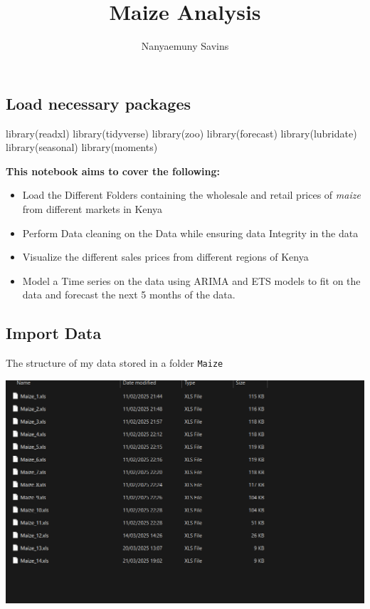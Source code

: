 \documentclass[
  letterpaper,
  DIV=11,
  numbers=noendperiod]{scrartcl}
\title{Maize Analysis}
\author{Nanyaemuny Savins}
\date{}
\newenvironment{Shaded}{\begin{snugshade}}{\end{snugshade}}
\newcommand{\FunctionTok}[1]{\textcolor[rgb]{0.28,0.35,0.67}{#1}}
\newcommand{\NormalTok}[1]{\textcolor[rgb]{0.00,0.23,0.31}{#1}}
\begin{document}
\maketitle


\subsection{Load necessary packages}\label{load-necessary-packages}

\begin{Shaded}
\begin{Highlighting}[]
\FunctionTok{library}\NormalTok{(readxl)}
\FunctionTok{library}\NormalTok{(tidyverse)}
\FunctionTok{library}\NormalTok{(zoo)}
\FunctionTok{library}\NormalTok{(forecast)}
\FunctionTok{library}\NormalTok{(lubridate)}
\FunctionTok{library}\NormalTok{(seasonal)}
\FunctionTok{library}\NormalTok{(moments)}
\end{Highlighting}
\end{Shaded}

\textbf{This notebook aims to cover the following:}

\begin{itemize}
\item
  Load the Different Folders containing the wholesale and retail prices
  of \emph{maize} from different markets in Kenya
\item
  Perform Data cleaning on the Data while ensuring data Integrity in the
  data
\item
  Visualize the different sales prices from different regions of Kenya
\item
  Model a Time series on the data using ARIMA and ETS models to fit on
  the data and forecast the next 5 months of the data.
\end{itemize}

\subsection{Import Data}\label{import-data}

The structure of my data stored in a folder \texttt{Maize}

\includegraphics{images/clipboard-1657767075.png}
\end{document}
